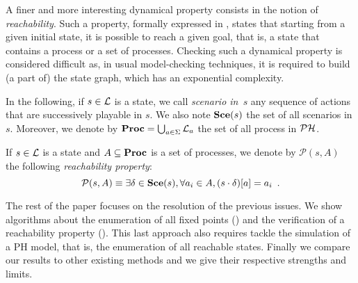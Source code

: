 A finer and more interesting dynamical property consists in
the notion of \emph{reachability}.
Such a property, formally expressed in ,
states that starting from a given initial state, it is possible
to reach a given goal, that is, a state that contains a process
or a set of processes.
Checking such a dynamical property is considered difficult
as, in usual model-checking techniques,
it is required to build (a part of) the state graph,
which has an exponential complexity.

In the following, if $s \in \mathcal{L}$ is a state,
we call \emph{scenario in~$s$}
any sequence of actions that are successively playable in $s$.
We also note $\mathbf{Sce}(s)$ the set of all scenarios in $s$.
Moreover, we denote by $\mathbf{Proc} = \bigcup_{a \in \Sigma} \mathcal{L}_a$
the set of all process in $\mathcal{PH}$.

\begin{definition}
\label{def:reachability}
  If $s \in \mathcal{L}$ is a state and $A \subseteq \mathbf{Proc}$ is a set of processes,
  we denote by $\mathcal{P}(s, A)$ the following \emph{reachability property}:
  \[\mathcal{P}(s, A) \equiv \exists \delta \in \mathbf{Sce}(s), \forall a_i \in A, {(s \cdot \delta)[a]} = a_i
    \enspace.\]
\end{definition}

The rest of the paper focuses on the resolution of the previous issues. We show algorithms about
the enumeration of all fixed points () and the verification of a reachability property ().
This last approach also requires tackle the simulation of a PH model, that is, the enumeration of all reachable states.
Finally we compare our results to other existing methods and we give their respective strengths and limits.
